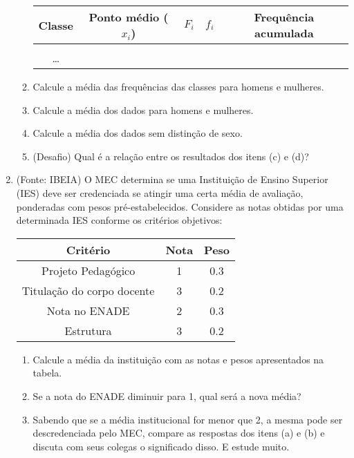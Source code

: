 \documentclass[a4paper]{article}
\begin{document}
\begin{enumerate}
\begin{enumerate}
  \begin{center}
  \begin{tabular}[h]{|c|c|c|c|c|}
    \hline
    Classe & Ponto médio ($x_i$) & $F_i$ & $f_i$ & Frequência acumulada\\
    \hline
    &&&&\\
    \hline
    \ldots &&&&\\
    \hline
  \end{tabular}
\end{center}

\item Calcule a média das frequências das classes para homens e mulheres.

\item Calcule a média dos dados para homens e mulheres.

\item Calcule a média dos dados sem distinção de sexo.
\item (Desafio) Qual é a relação entre os resultados dos itens (c) e (d)?
  \end{enumerate}

\item (Fonte: IBEIA) O MEC determina se uma Instituição de Ensino
  Superior (IES) deve ser credenciada se atingir uma certa média de
  avaliação, ponderadas com pesos pré-estabelecidos. Considere as
  notas obtidas por uma determinada IES conforme os critérios
  objetivos:

  \begin{center}
    \begin{tabular}[h]{|c|c|c|}
      \hline
      Critério & Nota & Peso\\
      \hline
      Projeto Pedagógico & 1 & 0.3\\
      \hline
      Titulação do corpo docente & 3 & 0.2 \\
      \hline
      Nota no ENADE &  2 & 0.3\\
      \hline
      Estrutura &  3 & 0.2\\
      \hline
    \end{tabular}
  \end{center}

  \begin{enumerate}
  \item Calcule a média da instituição com as notas e pesos
    apresentados na tabela.
  \item Se a nota do ENADE diminuir para 1, qual será a nova média?
  \item Sabendo que se a média institucional for menor que 2, a mesma
    pode ser descredenciada pelo MEC, compare as respostas dos itens
    (a) e (b) e discuta com seus colegas o significado disso. E estude
    muito.
  \end{enumerate}
  

\end{enumerate}
\end{document}
